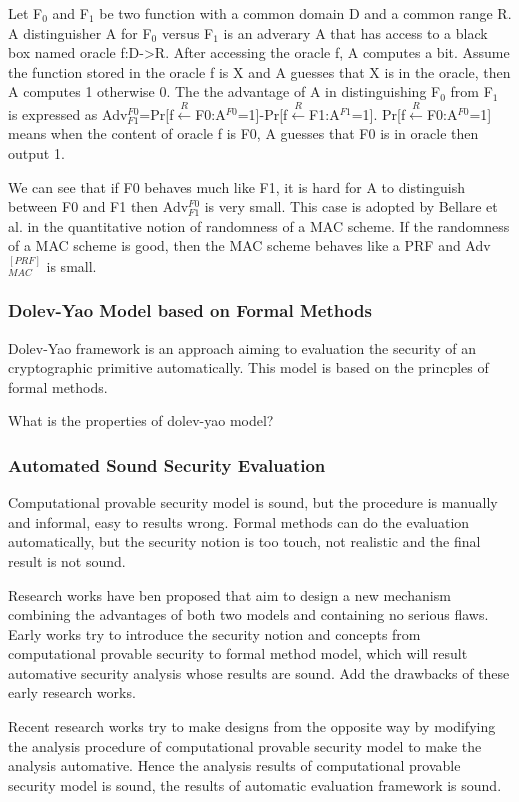 \documentclass{article}
\begin{document}
Let F$_0$ and F$_1$ be two function with a common domain D and a common range R. A distinguisher A for F$_0$ versus F$_1$ is an adverary A that has access to a black box named oracle f:D->R. After accessing the oracle f, A computes a bit. Assume the function stored in the oracle f is X and A guesses that X is in the oracle, then A computes 1 otherwise 0. The the advantage of A in distinguishing F$_0$ from F$_1$ is expressed as Adv$^{F0}_{F1}$=Pr[f$\stackrel{R}{\longleftarrow}$F0:A$^{F0}$=1]-Pr[f$\stackrel{R}{\longleftarrow}$F1:A$^{F1}$=1]. Pr[f$\stackrel{R}{\longleftarrow}$F0:A$^{F0}$=1] means when the content of oracle f is F0, A guesses that F0 is in oracle then output 1.

We can see that if F0 behaves much like F1, it is hard for A to distinguish between F0 and F1 then Adv$^{F0}_{F1}$ is very small. This case is adopted by Bellare et al. in the quantitative notion of randomness of a MAC scheme. If the randomness of a MAC scheme is good, then the MAC scheme behaves like a PRF and Adv$^{[PRF]}_{MAC}$ is small. 

\subsubsection{Dolev-Yao Model based on Formal Methods}
Dolev-Yao \cite{keylist} framework is an approach aiming to evaluation the security of an cryptographic primitive automatically. This model is based on the princples of formal methods. 

What is the properties of dolev-yao model?

\subsubsection{Automated Sound Security Evaluation}
Computational provable security model is sound, but the procedure is manually and informal, easy to results wrong. 
Formal methods can do the evaluation automatically, but the security notion is too touch, not realistic and the final result is not sound.

Research works have ben proposed that aim to design a new mechanism combining the advantages of both two models and containing no serious flaws. Early works try to introduce the security notion and concepts from computational provable security to formal method model, which will result automative security analysis whose results are sound.
Add the drawbacks of these early research works.

Recent research works try to make designs from the opposite way by modifying the analysis procedure of computational provable security model to make the analysis automative. Hence the analysis results of computational provable security model is sound, the results of automatic evaluation framework is sound. 
\end{document}

